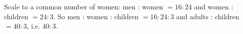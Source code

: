 Scale to a common number of women: men : women $=16:24$ and women : children $=24:3$. So men : women : children $=16:24:3$ and adults : children $=40:3$, i.e. $\boxed{40:3}$.
